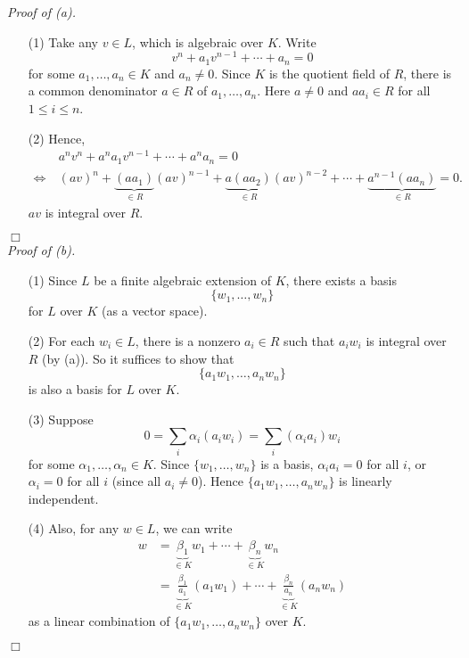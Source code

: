 \documentclass{article}
\begin{document}
\emph{Proof of (a).}
\begin{enumerate}
\item[(1)]
  Take any $v \in L$, which is algebraic over $K$.
  Write
  \[
    v^n + a_1 v^{n-1} + \cdots + a_n = 0
  \]
  for some $a_1, \ldots, a_n \in K$ and $a_n \neq 0$.
  Since $K$ is the quotient field of $R$,
  there is a common denominator $a \in R$ of $a_1, \ldots, a_n$.
  Here $a \neq 0$ and $aa_i \in R$ for all $1 \leq i \leq n$.

\item[(2)]
  Hence,
  \begin{align*}
    & \: a^n v^n + a^n a_1 v^{n-1} + \cdots + a^n a_n = 0 \\
    \Longleftrightarrow & \:
    (av)^n
      + \underbrace{(aa_1)}_{\in R} (av)^{n-1}
      + \underbrace{a(aa_2)}_{\in R} (av)^{n-2}
      + \cdots
      + \underbrace{a^{n-1}(aa_n)}_{\in R} = 0.
  \end{align*}
  $av$ is integral over $R$.
\end{enumerate}
$\Box$ \\



\emph{Proof of (b).}
\begin{enumerate}
\item[(1)]
  Since $L$ be a finite algebraic extension of $K$,
  there exists a basis
  \[
    \{ w_1, \ldots, w_n \}
  \]
  for $L$ over $K$ (as a vector space).

\item[(2)]
  For each $w_i \in L$, there is a nonzero $a_i \in R$ such that
  $a_i w_i$ is integral over $R$ (by (a)).
  So it suffices to show that
  \[
    \{ a_1 w_1, \ldots, a_n w_n \}
  \]
  is also a basis for $L$ over $K$.

\item[(3)]
  Suppose
  \[
    0 = \sum_{i} \alpha_i (a_i w_i) = \sum_{i} (\alpha_i a_i) w_i
  \]
  for some $\alpha_1, \ldots, \alpha_n \in K$.
  Since $\{ w_1, \ldots, w_n \}$ is a basis,
  $\alpha_i a_i = 0$ for all $i$, or $\alpha_i = 0$ for all $i$ (since all $a_i \neq 0$).
  Hence $\{ a_1 w_1, \ldots, a_n w_n \}$ is linearly independent.

\item[(4)]
  Also,
  for any $w \in L$, we can write
  \begin{align*}
    w
    &= \underbrace{\beta_1}_{\in K} w_1 + \cdots + \underbrace{\beta_n}_{\in K} w_n \\
    &= \underbrace{\frac{\beta_1}{a_1}}_{\in K} (a_1 w_1) + \cdots
      + \underbrace{\frac{\beta_n}{a_n}}_{\in K} (a_n w_n)
  \end{align*}
  as a linear combination of $\{ a_1 w_1, \ldots, a_n w_n \}$ over $K$.
\end{enumerate}
$\Box$ \\\\
\end{document}
